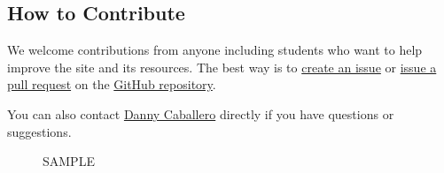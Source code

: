 \subsection{How to Contribute}\label{how-to-contribute}

We welcome contributions from anyone including students who want to help
improve the site and its resources. The best way is to
\href{https://github.com/dannycab/modern-classical-mechanics/issues}{create
an issue} or
\href{https://github.com/dannycab/modern-classical-mechanics/pulls}{issue
a pull request} on the
\href{https://github.com/dannycab/modern-classical-mechanics}{GitHub
repository}.

\href{https://github.com/dannycab/modern-classical-mechanics/issues}{}
\href{https://github.com/dannycab/modern-classical-mechanics/pulls}{}

You can also contact \href{https://dannycab.github.io/}{Danny Caballero}
directly if you have questions or suggestions.

\begin{figure}
\centering
{}
\caption{SAMPLE}
\end{figure}
